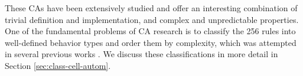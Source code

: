 These \acp{CA} have been extensively studied and offer an interesting combination of
trivial definition and implementation, and complex and unpredictable properties.
One of the fundamental problems of \ac{CA} research is to classify the 256 rules
into well-defined behavior types and order them by complexity, which was
attempted in several previous works
\parencite{wuenscheGlobalDynamicsCellular1992,
  gutowitzTransientsCyclesComplexity1991,
  wuenscheClassifyingCellularAutomata1999, wolframNewKindScience2002,
  zenilCompressionBasedInvestigationDynamical2010,
  hudcovaClassificationComplexSystems2020,
  hudcovaComputationalHierarchyElementary2021}. We discuss these classifications
in more detail in Section \ref{sec:class-cell-autom}.

\begin{figure}[htbp]
  \centering
  \begin{subfigure}[t]{.04\linewidth}
  \centering

\end{subfigure}
\end{figure}
